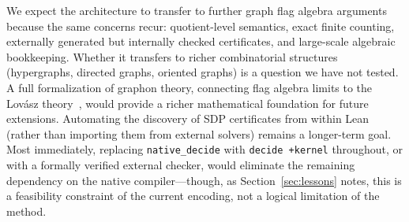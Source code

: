 \documentclass{article}
\newcommand{\lean}[1]{\texttt{#1}}
\begin{document}
We expect the architecture to transfer to further graph flag algebra
arguments because the same concerns recur: quotient-level semantics, exact
finite counting, externally generated but internally checked certificates,
and large-scale algebraic bookkeeping.  Whether it transfers to richer
combinatorial structures (hypergraphs, directed graphs, oriented graphs) is
a question we have not tested.  A full formalization of graphon theory,
connecting flag algebra limits to the Lov\'asz theory~\cite{lovasz2012large},
would provide a richer mathematical foundation for future extensions.
Automating the discovery of SDP certificates from within Lean (rather than
importing them from external solvers) remains a longer-term goal.  Most
immediately, replacing \lean{native\_decide} with \lean{decide +kernel}
throughout, or with a formally verified external checker, would eliminate
the remaining dependency on the native compiler---though, as
Section~\ref{sec:lessons} notes, this is a feasibility constraint of the
current encoding, not a logical limitation of the method.
\end{document}
